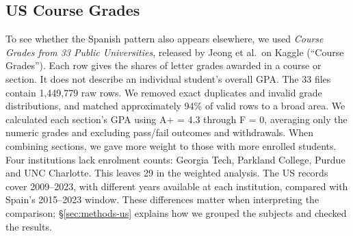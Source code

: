 \subsection{US Course Grades}
\label{sec:data-us}

To see whether the Spanish pattern also appears elsewhere, we used \textit{Course Grades from 33 Public Universities}, released by Jeong et al.\ on Kaggle (``Course Grades''). Each row gives the shares of letter grades awarded in a course or section. It does not describe an individual student's overall GPA. The 33 files contain 1,449,779 raw rows. We removed exact duplicates and invalid grade distributions, and matched approximately 94\% of valid rows to a broad area. We calculated each section's GPA using A+ = 4.3 through F = 0, averaging only the numeric grades and excluding pass/fail outcomes and withdrawals. When combining sections, we gave more weight to those with more enrolled students. Four institutions lack enrolment counts: Georgia Tech, Parkland College, Purdue and UNC Charlotte. This leaves 29 in the weighted analysis. The US records cover 2009--2023, with different years available at each institution, compared with Spain's 2015--2023 window. These differences matter when interpreting the comparison; \S\ref{sec:methods-us} explains how we grouped the subjects and checked the results.
